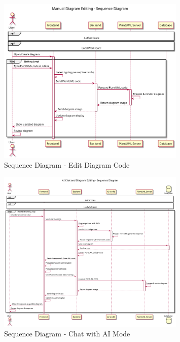 \begin{figure}[H]
\centering
\includegraphics[width=0.8\textwidth]{conception/SprintIV/sequence_diagrams/sequence_workspaceManagement_5_2_EditDiagramCode.png}
\caption{Sequence Diagram - Edit Diagram Code}
\end{figure}

\begin{figure}[H]
\centering
\includegraphics[width=0.8\textwidth]{conception/SprintIV/sequence_diagrams/sequence_workspaceManagement_5_3_ChatWithAIMode.png}
\caption{Sequence Diagram - Chat with AI Mode}
\end{figure}

